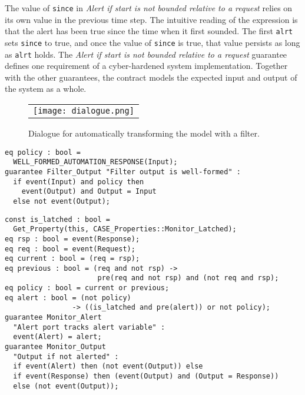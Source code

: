 The value of \texttt{since} in \emph{Alert if start is not bounded relative to a request} relies on its own value in the previous time step. The intuitive reading of the expression is that the alert has been true since the time when it first sounded. The first \texttt{alrt} sets \texttt{since} to true, and once the value of \texttt{since} is true, that value persists as long as \texttt{alrt} holds. The \emph{Alert if start is not bounded relative to a request} guarantee defines one requirement of a cyber-hardened system implementation. Together with the other guarantees, the contract models the expected input and output of the system as a whole.

\begin{figure}
  \begin{center}
    \begin{tabular}{c}
      \texttt{[image: dialogue.png]}
    \end{tabular}
  \end{center}
  \caption{Dialogue for automatically transforming the model with a filter.}
  \label{fig:dialogue}
\end{figure}

\newsavebox{\flt}
\begin{lrbox}{\flt}
\begin{lstlisting}[style=agree]
eq policy : bool = 
  WELL_FORMED_AUTOMATION_RESPONSE(Input);       
guarantee Filter_Output "Filter output is well-formed" :
  if event(Input) and policy then 
    event(Output) and Output = Input
  else not event(Output);
\end{lstlisting}
\end{lrbox}

\newsavebox{\mntr}
\begin{lrbox}{\mntr}
\begin{lstlisting}[style=agree]
const is_latched : bool = 
  Get_Property(this, CASE_Properties::Monitor_Latched);
eq rsp : bool = event(Response);
eq req : bool = event(Request);
eq current : bool = (req = rsp);
eq previous : bool = (req and not rsp) ->
                      pre(req and not rsp) and (not req and rsp);
eq policy : bool = current or previous;
eq alert : bool = (not policy) 
                -> ((is_latched and pre(alert)) or not policy);
guarantee Monitor_Alert 
  "Alert port tracks alert variable" :
  event(Alert) = alert;
guarantee Monitor_Output
  "Output if not alerted" :
  if event(Alert) then (not event(Output)) else
  if event(Response) then (event(Output) and (Output = Response))
  else (not event(Output));
\end{lstlisting}
\end{lrbox}
  
